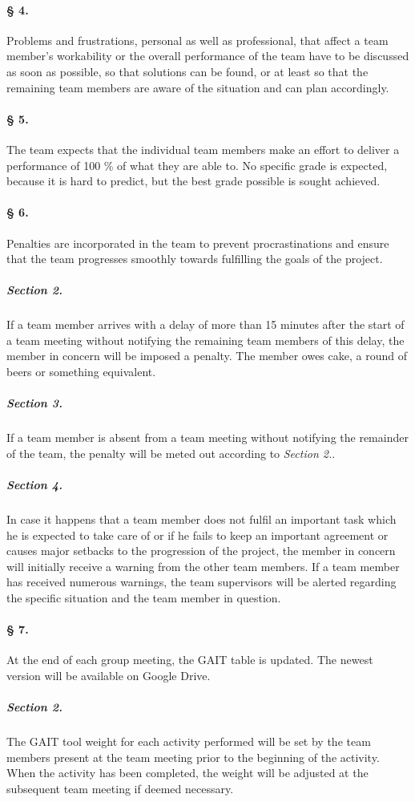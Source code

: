 \documentclass{article}
\begin{document}
\paragraph{§ 4.}
Problems and frustrations, personal as well as professional, that affect a team member’s workability or the overall performance of the team have to be discussed as soon as possible, so that solutions can be found, or at least so that the remaining team members are aware of the situation and can plan accordingly. 
\paragraph{§ 5.}
The team expects that the individual team members make an effort to deliver a performance of 100 \% of what they are able to. No specific grade is expected, because it is hard to predict, but the best grade possible is sought achieved.
\newline
\paragraph{§ 6.}
Penalties are incorporated in the team to prevent procrastinations and ensure that the team progresses smoothly towards fulfilling the goals of the project. 
\subparagraph{Section 2.}
If a team member arrives with a delay of more than 15 minutes after the start of a team meeting without notifying the remaining team members of this delay, the member in concern will be imposed a penalty. The member owes cake, a round of beers or something equivalent.
\subparagraph{Section 3.}
If a team member is absent from a team meeting without notifying the remainder of the team, the penalty will be meted out according to \textit{Section 2.}.
\subparagraph{Section 4.}
In case it happens that a team member does not fulfil an important task which he is expected to take care of or if he fails to keep an important agreement or causes major setbacks to the progression of the project, the member in concern will initially receive a warning from the other team members. If a team member has received numerous warnings, the team supervisors will be alerted regarding the specific situation and the team member in question.
\paragraph{§ 7.}
At the end of each group meeting, the GAIT table is updated. The newest version will be available on Google Drive. 
\subparagraph{Section 2.}
The GAIT tool weight for each activity performed will be set by the team members present at the team meeting prior to the beginning of the activity. When the activity has been completed, the weight will be adjusted at the subsequent team meeting if deemed necessary.
\end{document}
